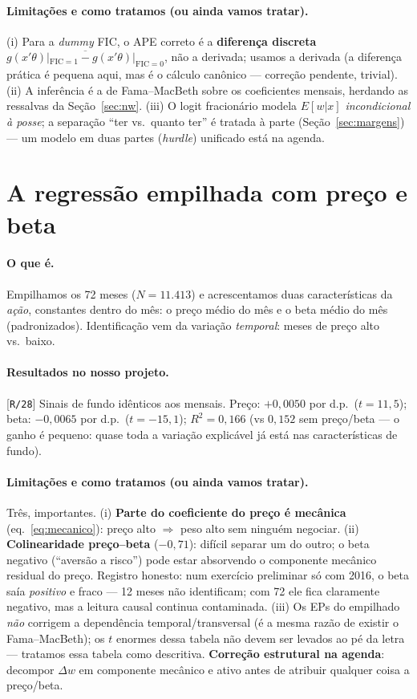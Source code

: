 \documentclass[11pt,a4paper]{article}
\newcommand{\oquee}[0]{\paragraph{O que é.}}
\newcommand{\resultados}[0]{\paragraph{Resultados no nosso projeto.}}
\newcommand{\limitacoes}[0]{\paragraph{Limitações e como tratamos (ou ainda vamos tratar).}}
\newcommand{\scriptref}[1]{{\footnotesize\color{cinza}[\texttt{#1}]}}
\begin{document}
\limitacoes (i) Para a \emph{dummy} FIC, o APE correto é a \textbf{diferença discreta}
$\overline{g(x'\theta)|_{\mathrm{FIC}=1} - g(x'\theta)|_{\mathrm{FIC}=0}}$, não a derivada; usamos a
derivada (a diferença prática é pequena aqui, mas é o cálculo canônico --- correção pendente,
trivial). (ii) A inferência é a de Fama--MacBeth sobre os coeficientes mensais, herdando as
ressalvas da Seção~\ref{sec:nw}. (iii) O logit fracionário modela $E[w|x]$ \emph{incondicional à
posse}; a separação ``ter vs.\ quanto ter'' é tratada à parte (Seção~\ref{sec:margens}) --- um
modelo em duas partes (\emph{hurdle}) unificado está na agenda.

\section{A regressão empilhada com preço e beta}
\label{sec:pooled}

\oquee Empilhamos os 72 meses ($N=11.413$) e acrescentamos duas características da \emph{ação},
constantes dentro do mês: o preço médio do mês e o beta médio do mês (padronizados). Identificação
vem da variação \emph{temporal}: meses de preço alto vs.\ baixo.

\resultados \scriptref{R/28} Sinais de fundo idênticos aos mensais. Preço: $+0{,}0050$ por d.p.\
($t=11{,}5$); beta: $-0{,}0065$ por d.p.\ ($t=-15{,}1$); $R^2=0{,}166$ (vs $0{,}152$ sem
preço/beta --- o ganho é pequeno: quase toda a variação explicável já está nas características de
fundo).

\limitacoes Três, importantes. (i) \textbf{Parte do coeficiente do preço é mecânica}
(eq.~\ref{eq:mecanico}): preço alto $\Rightarrow$ peso alto sem ninguém negociar. (ii)
\textbf{Colinearidade preço--beta} ($-0{,}71$): difícil separar um do outro; o beta negativo
(``aversão a risco'') pode estar absorvendo o componente mecânico residual do preço. Registro
honesto: num exercício preliminar só com 2016, o beta saía \emph{positivo} e fraco --- 12 meses
não identificam; com 72 ele fica claramente negativo, mas a leitura causal continua contaminada.
(iii) Os EPs do empilhado \emph{não} corrigem a dependência temporal/transversal (é a mesma razão
de existir o Fama--MacBeth); os $t$ enormes dessa tabela não devem ser levados ao pé da letra ---
tratamos essa tabela como descritiva. \textbf{Correção estrutural na agenda}: decompor
$\Delta w$ em componente mecânico e ativo antes de atribuir qualquer coisa a preço/beta.
\end{document}
